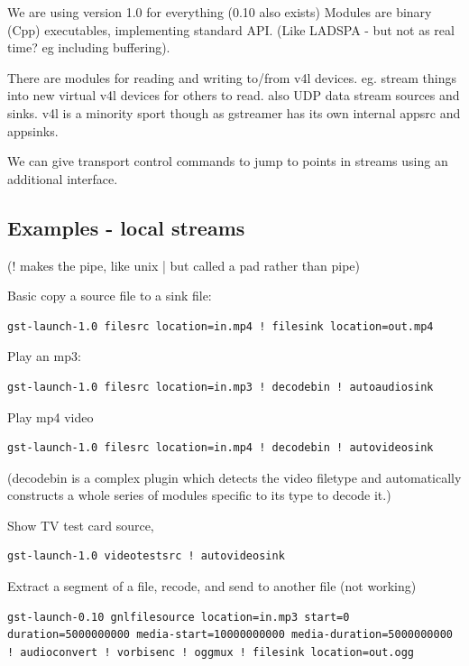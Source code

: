 \documentclass[oneside,english]{scrbook}
\begin{document}
We are using version 1.0 for everything (0.10 also exists) Modules
are binary (Cpp) executables, implementing standard API. (Like LADSPA
- but not as real time? eg including buffering).

There are modules for reading and writing to/from v4l devices. eg. stream things
into new virtual v4l devices for others to read. also UDP data stream
sources and sinks. v4l is a minority sport though as gstreamer has
its own internal appsrc and appsinks.

We can give transport control commands to jump to points in streams using an additional interface.

\subsection{Examples - local streams}

(\textquotedbl{}!\textquotedbl{} makes the pipe, like unix \textquotedbl{}|\textquotedbl{}
but called a \textquotedbl{}pad\textquotedbl{} rather than \textquotedbl{}pipe\textquotedbl{})

Basic copy a source file to a sink file: 

\begin{lstlisting}
gst-launch-1.0 filesrc location=in.mp4 ! filesink location=out.mp4
\end{lstlisting}

Play an mp3:

\begin{lstlisting}
gst-launch-1.0 filesrc location=in.mp3 ! decodebin ! autoaudiosink
\end{lstlisting}

Play mp4 video 
\begin{lstlisting}
gst-launch-1.0 filesrc location=in.mp4 ! decodebin ! autovideosink
\end{lstlisting}
(decodebin is a complex plugin which detects the video filetype and automatically constructs a whole series of modules specific to its type to decode it.)

Show TV test card source,
\begin{lstlisting}
gst-launch-1.0 videotestsrc ! autovideosink
\end{lstlisting}

Extract a segment of a file, recode, and send to another file (not
working) 

\begin{lstlisting}
gst-launch-0.10 gnlfilesource location=in.mp3 start=0
duration=5000000000 media-start=10000000000 media-duration=5000000000
! audioconvert ! vorbisenc ! oggmux ! filesink location=out.ogg
\end{lstlisting}
\end{document}
